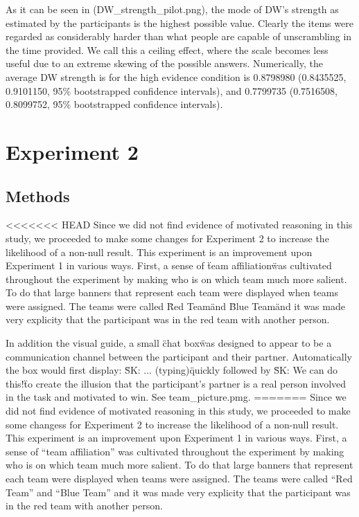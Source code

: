 \documentclass{article}
\begin{document}
As it can be seen in (DW\_strength\_pilot.png), the mode of DW's strength as estimated by the participants is the highest possible value. Clearly the items were regarded as considerably harder than what people are capable of unscrambling in the time provided. We call this a ceiling effect, where the scale becomes less useful due to an extreme skewing of the possible answers. Numerically, the average DW strength is for the high evidence condition is 0.8798980 (0.8435525, 0.9101150, 95\% bootstrapped confidence intervals), and 0.7799735 (0.7516508, 0.8099752, 95\% bootstrapped confidence intervals).

\section{Experiment 2}

\subsection{Methods}


<<<<<<< HEAD
Since we did not find evidence of motivated reasoning in this study, we proceeded to make some changes for Experiment 2 to increase the likelihood of a non-null result. This experiment is an improvement upon Experiment 1 in various ways. First, a sense of \"team affiliation\" was cultivated throughout the experiment by making who is on which team much more salient. To do that large banners that represent each team were displayed when teams were assigned. The teams were called \"Red Team\" and \"Blue Team\" and it was made very explicity that the participant was in the red team with another person. 

In addition the visual guide, a small \"chat box\" was designed to appear to be a communication channel between the participant and their partner. Automatically the box would first display: \"SK: ... (typing)\" quickly followed by \"SK: We can do this!\" to create the illusion that the participant's partner is a real person involved in the task and motivated to win. See team\_picture.pmg.
=======
Since we did not find evidence of motivated reasoning in this study, we proceeded to make some changess for Experiment 2 to increase the likelihood of a non-null result. This experiment is an improvement upon Experiment 1 in various ways. First, a sense of ``team affiliation'' was cultivated throughout the experiment by making who is on which team much more salient. To do that large banners that represent each team were displayed when teams were assigned. The teams were called ``Red Team'' and ``Blue Team'' and it was made very explicity that the participant was in the red team with another person. 
\end{document}
